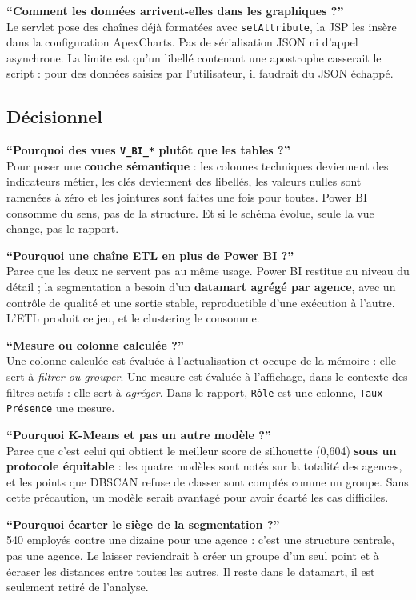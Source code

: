 \textbf{\enquote{Comment les données arrivent-elles dans les graphiques ?}}\\
Le servlet pose des chaînes déjà formatées avec \texttt{setAttribute}, la JSP
les insère dans la configuration ApexCharts. Pas de sérialisation JSON ni
d'appel asynchrone. La limite est qu'un libellé contenant une apostrophe
casserait le script : pour des données saisies par l'utilisateur, il faudrait
du JSON échappé.

\subsection{Décisionnel}

\textbf{\enquote{Pourquoi des vues \texttt{V\_BI\_*} plutôt que les tables ?}}\\
Pour poser une \textbf{couche sémantique} : les colonnes techniques deviennent
des indicateurs métier, les clés deviennent des libellés, les valeurs nulles
sont ramenées à zéro et les jointures sont faites une fois pour toutes. Power
BI consomme du sens, pas de la structure. Et si le schéma évolue, seule la vue
change, pas le rapport.

\textbf{\enquote{Pourquoi une chaîne ETL en plus de Power BI ?}}\\
Parce que les deux ne servent pas au même usage. Power BI restitue au niveau du
détail ; la segmentation a besoin d'un \textbf{datamart agrégé par agence},
avec un contrôle de qualité et une sortie stable, reproductible d'une exécution
à l'autre. L'ETL produit ce jeu, et le clustering le consomme.

\textbf{\enquote{Mesure ou colonne calculée ?}}\\
Une colonne calculée est évaluée à l'actualisation et occupe de la mémoire :
elle sert à \emph{filtrer ou grouper}. Une mesure est évaluée à l'affichage,
dans le contexte des filtres actifs : elle sert à \emph{agréger}. Dans le
rapport, \texttt{Rôle} est une colonne, \texttt{Taux Présence} une mesure.

\textbf{\enquote{Pourquoi K-Means et pas un autre modèle ?}}\\
Parce que c'est celui qui obtient le meilleur score de silhouette (0,604)
\textbf{sous un protocole équitable} : les quatre modèles sont notés sur la
totalité des agences, et les points que DBSCAN refuse de classer sont comptés
comme un groupe. Sans cette précaution, un modèle serait avantagé pour avoir
écarté les cas difficiles.

\textbf{\enquote{Pourquoi écarter le siège de la segmentation ?}}\\
540 employés contre une dizaine pour une agence : c'est une structure
centrale, pas une agence. Le laisser reviendrait à créer un groupe d'un seul
point et à écraser les distances entre toutes les autres. Il reste dans le
datamart, il est seulement retiré de l'analyse.

